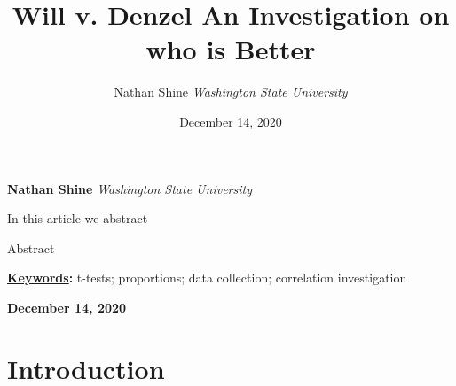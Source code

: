 \documentclass[]{article}
\title{\textbf{\textcolor{WSU.crimson}{Will v.
Denzel}} \newline \textbf{\textcolor{WSU.gray}{An Investigation on who
is Better}}  }
\author{\Large Nathan
Shine\vspace{0.05in} \newline\normalsize\emph{Washington State
University}  }
\date{December 14, 2020}
\newcommand*{\authorfont}{\fontfamily{phv}\selectfont}
\renewenvironment{abstract}
 {{%
    \setlength{\leftmargin}{0mm}
    \setlength{\rightmargin}{\leftmargin}%
  }%
  \relax}
 {\endlist}
\begin{document}
	
%    


{%
\setlength{\parindent}{0pt}
\thispagestyle{plain}
{\fontsize{18}{20}\selectfont\raggedright 
\maketitle  %

}

{
   \vskip 13.5pt\relax \normalsize\fontsize{11}{12} 
   
\textbf{\authorfont Nathan Shine} \hskip 15pt \emph{\small Washington
State University}   

}

}








\begin{abstract}

    \hbox{\vrule height .2pt width 39.14pc}

    \vskip 8.5pt %

\noindent In this article we abstract

\noindent Abstract\vspace{0.25in}


\vskip 8.5pt \noindent \textbf{\underline{Keywords}:} t-tests;
proportions; data collection; correlation investigation \par

    




    
    \hbox{\vrule height .2pt width 39.14pc}
    \vskip 5pt 
    \hfill \textbf{\textcolor{WSU.gray}{ December 14, 2020 } }
    \vskip 5pt 
    
\end{abstract}


\vskip -8.5pt




\noindent  

\section{Introduction}
\label{sec:intro}
\end{document}

